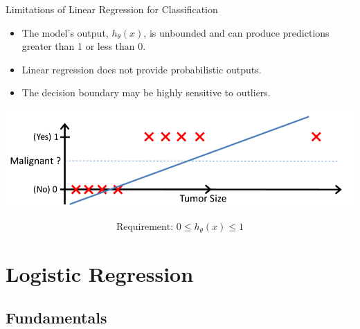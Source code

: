 \documentclass[serif, aspectratio=169]{beamer}
\begin{document}
\begin{frame}{Limitations of Linear Regression for Classification}
    \begin{itemize}
        \item The model's output, $h_\theta(x)$, is unbounded and can produce predictions greater than 1 or less than 0.
        \item Linear regression does not provide probabilistic outputs.
        \item The decision boundary may be highly sensitive to outliers.
    \end{itemize}

    \vspace{0.5em}
    \centering
    \includegraphics[width=0.68\linewidth]{pic/lrClassification2.png}

    \[
        \text{Requirement: } 0 \le h_\theta(x) \le 1
    \]

\end{frame}




\section{Logistic Regression}

\subsection{Fundamentals}
\end{document}
